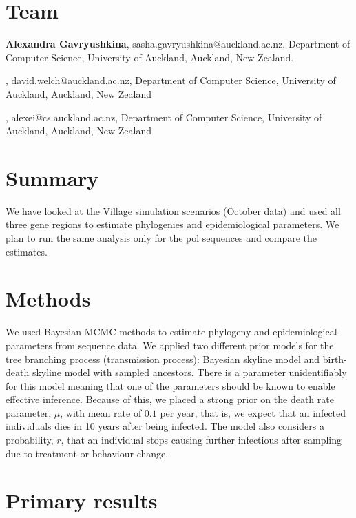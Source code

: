 \documentclass[12pt]{article}
\begin{document}
\section{Team}

{\bf Alexandra Gavryushkina}, sasha.gavryushkina@auckland.ac.nz, Department of Computer Science, University of Auckland, Auckland, New Zealand. 

\vskip2mm

, david.welch@auckland.ac.nz, Department of Computer Science, University of Auckland, Auckland, New Zealand

\vskip2mm

, alexei@cs.auckland.ac.nz, Department of Computer Science, University of Auckland, Auckland, New Zealand


\section{Summary}

We have looked at the Village simulation scenarios (October data) and used all three gene regions to estimate phylogenies and epidemiological parameters. We plan to run the same analysis only for the pol sequences and compare the estimates. 

\section{Methods}

We used Bayesian MCMC methods to estimate phylogeny and epidemiological parameters from sequence data. We applied two different prior models for the tree branching process (transmission process): Bayesian skyline model and birth-death skyline model with sampled ancestors. There is a parameter unidentifiably for this model meaning that one of the parameters should be known to enable effective inference. Because of this, we placed a strong prior on the death rate parameter, $\mu$, with mean rate of $0.1$ per year, that is, we expect that an infected individuals dies in 10 years after being infected. The model also considers a probability, $r$, that an individual stops causing further infectious after sampling due to treatment or behaviour change. 

\section{Primary results}
\end{document}
